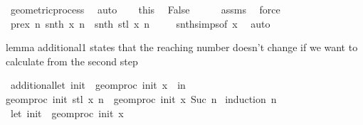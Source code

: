 \begin{isabellebody}
\ geometric{\isacharunderscore}{\kern0pt}process\ \isamarkupfalse%
\ auto\isanewline
\ \ \isamarkupfalse%
\ this\ \isamarkupfalse%
\ {\isachardoublequoteopen}False{\isachardoublequoteclose}\isanewline
\ \ \ \ \isamarkupfalse%
\ assms\ \isamarkupfalse%
\ force\isanewline
{}\isamarkupfalse%
%
\endisatagproof
{\isafoldproof}%
%
\isadelimproof
%
\endisadelimproof
%
\isadelimdocument
%
\endisadelimdocument
%
\isatagdocument
%
\isamarkuptrue%
%
\endisatagdocument
{\isafolddocument}%
%
\isadelimdocument
%
\endisadelimdocument
{}\isamarkupfalse%
\ pre{}{\isacharcolon}{\kern0pt}{\isachardoublequoteopen}{\isasymAnd}x\ n{\isachardot}{\kern0pt}\ snth\ x\ {\isacharparenleft}{\kern0pt}n{\isacharplus}{\kern0pt}{}{\isacharparenright}{\kern0pt}\ {\isacharequal}{\kern0pt}\ snth\ {\isacharparenleft}{\kern0pt}stl\ x{\isacharparenright}{\kern0pt}\ n\ {\isachardoublequoteclose}\isanewline
%
\isadelimproof
\ \ %
\endisadelimproof
%
\isatagproof
{}\isamarkupfalse%
\ snth{\isachardot}{\kern0pt}simps{\isacharbrackleft}{\kern0pt}of\ x{\isacharbrackright}{\kern0pt}\ \isamarkupfalse%
\ auto%
\endisatagproof
{\isafoldproof}%
%
\isadelimproof
%
\endisadelimproof
%
\begin{isamarkuptext}%
lemma additional1 states that the reaching number doesn't change if we want to calculate from the second step%
\end{isamarkuptext}\isamarkuptrue%
\isamarkupfalse%
\ additional{}{\isacharcolon}{\kern0pt}{\isachardoublequoteopen}let\ init{\isacharprime}{\kern0pt}\ {\isacharequal}{\kern0pt}\ geom{\isacharunderscore}{\kern0pt}proc\ init\ x\ {}\ in\ \isanewline
geom{\isacharunderscore}{\kern0pt}proc\ init{\isacharprime}{\kern0pt}\ {\isacharparenleft}{\kern0pt}stl\ x{\isacharparenright}{\kern0pt}\ n\ {\isacharequal}{\kern0pt}\ geom{\isacharunderscore}{\kern0pt}proc\ init\ x\ {\isacharparenleft}{\kern0pt}Suc\ n{\isacharparenright}{\kern0pt}{\isachardoublequoteclose}\isanewline
%
\isadelimproof
%
\endisadelimproof
%
\isatagproof
{}\isamarkupfalse%
\ {\isacharparenleft}{\kern0pt}induction\ n{\isacharparenright}{\kern0pt}\isanewline
\ \ \isamarkupfalse%
\ {\isachardoublequoteopen}let\ init{\isacharprime}{\kern0pt}\ {\isacharequal}{\kern0pt}\ geom{\isacharunderscore}{\kern0pt}proc\ init\ x\ {}\isanewline

\end{isabellebody}
